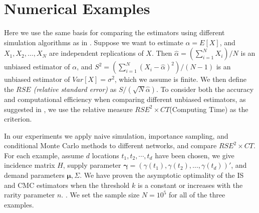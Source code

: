 \documentclass[final,11pt,3p]{article}\usepackage{setspace}
\begin{document}
{{}}
\section{Numerical Examples}

\label{sec:exp}

Here we use the same basis for comparing the estimators using different simulation algorithms as in \cite{bln}.
Suppose we want to estimate $\alpha= E[X]$, and $X_{1}, X_{2},\dots,X_{N}$ are
independent replications of $X$. Then $\widehat{\alpha} = (\sum_{i=1}^{N}
X_{i})/N$ is an unbiased estimator of $\alpha$, and $S^{2} = (\sum_{i=1}^{N}(X_{i} - \widehat{\alpha})^{2})/(N-1)$ is an unbiased estimator of
$Var[X]=\sigma^{2}$, which we assume is finite. We then define the \textit{$RSE$ (relative standard error)}
as ${S}/({\sqrt{N}\widehat{\alpha}})$. To consider both the accuracy and computational efficiency when comparing different unbiased estimators, as suggested in \cite{gw}, we use the relative
measure $RSE^{2} \times CT$(Computing Time) as the criterion.

In our experiments we apply naive simulation, importance sampling, and
conditional Monte Carlo methods to different networks, and compare $RSE^{2}
\times CT$. For each example, assume $d$ locations $t_1, t_2, \cdots, t_d$ have been chosen, we give incidence matrix $H$, supply parameter $\boldsymbol{\gamma} = (\gamma(t_1), \gamma(t_2),\dots, \gamma(t_d))'$, and demand parameters $\boldsymbol{\mu}, \Sigma$. We have proven the asymptotic optimality of the IS and CMC estimators when the threshold $k$ is a constant or increases with the rarity parameter $n$. {{}}. We set the sample size $N = 10^{5}$ for all of the three examples.
\end{document}
